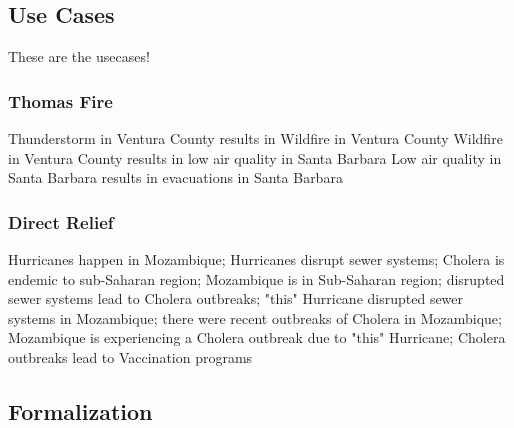 \subsection{Use Cases}
\label{ssec:use-cases}
These are the usecases!

\subsubsection{Thomas Fire}
Thunderstorm in Ventura County results in Wildfire in Ventura County
Wildfire in Ventura County results in low air quality in Santa Barbara
Low air quality in Santa Barbara results in evacuations in Santa Barbara

\subsubsection{Direct Relief}
Hurricanes happen in Mozambique; Hurricanes disrupt sewer systems; Cholera is endemic to sub-Saharan region; Mozambique is in Sub-Saharan region; disrupted sewer systems lead to Cholera outbreaks; "this" Hurricane disrupted sewer systems in Mozambique; there were recent outbreaks of Cholera in Mozambique; Mozambique is experiencing a Cholera outbreak due to "this" Hurricane; Cholera outbreaks lead to Vaccination programs



\subsection{Formalization}
\label{ssec:formalization}
